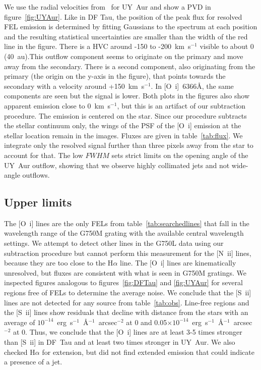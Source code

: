 \documentclass[twocolumn,trackchanges]{aastex63}
\begin{document}
We use the radial velocities from~\citet{2012ApJ...745..119N} for UY~Aur and
show a PVD in figure~\ref{fig:UYAur}.  
Like in DF Tau, the position of
  the peak flux for resolved FEL emission is determined by fitting Gaussians to
  the spectrum at each position and the resulting statistical uncertainties are smaller than
  the width of the red line in the figure.
There is a HVC around -150 to
-200~km~s$^{-1}$ visible to about 0 (40~au).This outflow component
seems to originate on the primary and move away from the secondary. There is a
second component, also originating from the primary (the origin on the y-axis
in the figure), that points towards the secondary with a velocity around
+150~km~s$^{-1}$. In [O~{\sc i}]~6366\AA{}, the same components are seen but
the signal is lower. Both plots in the figures also show apparent emission
close to 0~km~s$^{-1}$, but this is an artifact of our subtraction
procedure. The emission is centered on the star. Since our procedure subtracts
the stellar continuum only, the wings of the PSF of the [O~{\sc i}] emission at
the stellar location remain in the images. Fluxes are given in
table~\ref{tab:flux}. 
We
integrate only the resolved signal further than three pixels away from the star
to account for that.
The low $FWHM$ sets strict limits on the opening angle of the
  UY~Aur outflow, showing that we observe highly collimated jets and not
  wide-angle outflows.


\subsection{Upper limits}
The [O~{\sc i}] lines are the only FELs from table~\ref{tab:searchedlines} that fall in the wavelength range of the G750M grating with the available central wavelength settings. We attempt to detect other lines in the G750L data using our subtraction procedure but cannot perform this measurement for the [N~{\sc ii}] lines, because they are too close to the H$\alpha$ line. The [O~{\sc i}] lines are kinematically unresolved, but fluxes are consistent with what is seen in G750M gratings. We inspected figures analogous to figures~\ref{fig:DFTau} and \ref{fig:UYAur} for several regions free of FELs to determine the average noise. We conclude that the [S~{\sc ii}] lines are not detected for any source from table~\ref{tab:obs}. Line-free regions and the [S~{\sc ii}] lines show residuals that decline with distance from the stars with an average of $10^{-14}$~erg~s$^{-1}$~\AA{}$^{-1}$~arcsec$^{-2}$ at 0 and 0.05$\times10^{-14}$~erg~s$^{-1}$~\AA{}$^{-1}$~arcsec$^{-2}$ at 0. Thus, we conclude that the [O~{\sc i}] lines are at least 3-5 times stronger than [S~{\sc ii}] in DF~Tau and at least two times stronger in UY~Aur. We also checked H$\alpha$ for extension, but did not find extended emission that could indicate a presence of a jet. 
\end{document}
